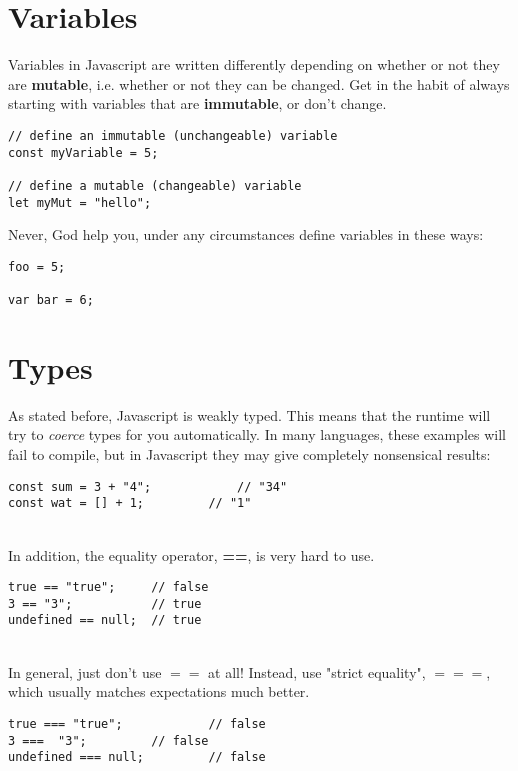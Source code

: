 \documentclass{article}
\begin{document}
\section{Variables}

Variables in Javascript are written differently depending on whether or not they are \textbf{mutable}, i.e. whether or not they can be changed. Get in the habit of always starting with variables that are \textbf{immutable}, or don't change.
\\
\begin{lstlisting}
// define an immutable (unchangeable) variable
const myVariable = 5;

// define a mutable (changeable) variable
let myMut = "hello";
\end{lstlisting}

Never, God help you, under any circumstances define variables in these ways:

\begin{lstlisting}
foo = 5;

var bar = 6;
\end{lstlisting}

\section{Types}

As stated before, Javascript is weakly typed. This means that the runtime will try to \textit{coerce} types for you automatically. In many languages, these examples will fail to compile, but in Javascript they may give completely nonsensical results:

\begin{lstlisting}
const sum = 3 + "4";			// "34"
const wat = [] + 1;			// "1"
\end{lstlisting}

\noindent
\\
In addition, the equality operator, \textbf{==}, is very hard to use.

\begin{lstlisting}
true == "true";		// false
3 == "3";			// true
undefined == null; 	// true
\end{lstlisting}

\noindent
\\
In general, just don't use $==$ at all! Instead, use "strict equality", $===$, which usually matches expectations much better.

\begin{lstlisting}
true === "true";			// false
3 ===  "3";			// false
undefined === null; 		// false
\end{lstlisting}
\end{document}
